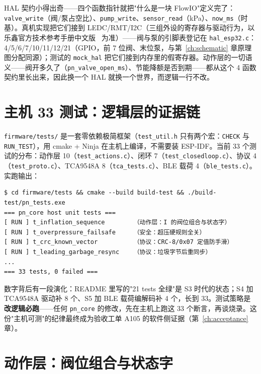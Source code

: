 HAL 契约小得出奇——四个函数指针就把"什么是一块 FlowIO"定义完了：\texttt{valve\_write}（阀/泵占空比）、\texttt{pump\_write}、\texttt{sensor\_read}（kPa）、\texttt{now\_ms}（时基）。真机实现把它们接到 LEDC/RMT/I2C（三组外设的寄存器与驱动行为，以乐鑫官方技术参考手册中文版~\cite{esp32s3-trm-cn} 为准）——阀与泵的引脚表登记在 \texttt{hal\_esp32.c}：4/5/6/7/10/11/12/21（GPIO，前 7 位阀、末位泵，与第~\ref{ch:schematic} 章原理图分配同源）；测试的 \texttt{mock\_hal} 把它们接到内存里的假寄存器。动作层的一切语义——阀开多久了（\texttt{pn\_valve\_open\_ms}）、节能降额是否到期——都从这个 4 函数契约里长出来，因此换一个 HAL 就换一个世界，而逻辑一行不改。

\section{主机 33 测试：逻辑层的证据链}
\label{sec:fw-tests}

\texttt{firmware/tests/} 是一套零依赖极简框架（\texttt{test\_util.h} 只有两个宏：\texttt{CHECK} 与 \texttt{RUN\_TEST}），用 cmake + Ninja 在主机上编译，不需要装 ESP-IDF。当前 33 个测试的分布：动作层 10（\texttt{test\_actions.c}）、闭环 7（\texttt{test\_closedloop.c}）、协议 4（\texttt{test\_proto.c}）、TCA9548A 8（\texttt{tca\_tests.c}）、BLE 载荷 4（\texttt{ble\_tests.c}）。实跑输出：

\begin{lstlisting}[basicstyle=\small\ttfamily, breaklines=true,
  caption={主机单元测试实跑（gcc/cmake/ninja，2026-10 当前状态）}]
$ cd firmware/tests && cmake --build build-test && ./build-test/pn_tests.exe
=== pn_core host unit tests ===
[ RUN ] t_inflation_sequence        （动作层：I 的阀位组合与状态字）
[ RUN ] t_overpressure_failsafe     （安全：超压硬规则全关）
[ RUN ] t_crc_known_vector          （协议：CRC-8/0x07 定值防手滑）
[ RUN ] t_leading_garbage_resync    （协议：垃圾字节后重同步）
...
=== 33 tests, 0 failed ===
\end{lstlisting}

数字背后有一段演化：README 里写的"21 tests 全绿"是 S3 时代的状态；S4 加 TCA9548A 驱动补 8 个、S5 加 BLE 载荷编解码补 4 个，长到 33。测试策略是\textbf{改逻辑必跑}——任何 \texttt{pn\_core} 的修改，先在主机上跑这 33 个断言，再谈烧录。这份"主机可测"的纪律最终成为验收工单 A105 的软件侧证据（第~\ref{ch:acceptance} 章）。

\section{动作层：阀位组合与状态字}
\label{sec:fw-actions}


